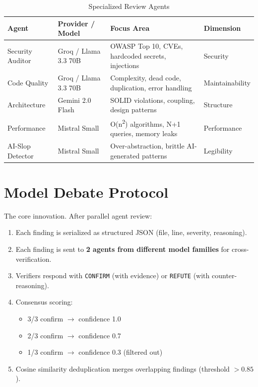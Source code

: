 \documentclass[12pt,a4paper]{article}
\begin{document}
\begin{table}[H]
\centering
\caption{Specialized Review Agents}
\begin{tabularx}{\textwidth}{llXl}
\toprule
\textbf{Agent} & \textbf{Provider / Model} & \textbf{Focus Area} & \textbf{Dimension} \\
\midrule
Security Auditor & Groq / Llama 3.3 70B & OWASP Top 10, CVEs, hardcoded secrets, injections & Security \\
Code Quality & Groq / Llama 3.3 70B & Complexity, dead code, duplication, error handling & Maintainability \\
Architecture & Gemini 2.0 Flash & SOLID violations, coupling, design patterns & Structure \\
Performance & Mistral Small & O(n\textsuperscript{2}) algorithms, N+1 queries, memory leaks & Performance \\
AI-Slop Detector & Mistral Small & Over-abstraction, brittle AI-generated patterns & Legibility \\
\bottomrule
\end{tabularx}
\end{table}

\section{Model Debate Protocol}

The core innovation. After parallel agent review:

\begin{enumerate}
    \item Each finding is serialized as structured JSON (file, line, severity, reasoning).
    \item Each finding is sent to \textbf{2 agents from different model families} for cross-verification.
    \item Verifiers respond with \texttt{CONFIRM} (with evidence) or \texttt{REFUTE} (with counter-reasoning).
    \item Consensus scoring:
    \begin{itemize}
        \item 3/3 confirm $\rightarrow$ confidence 1.0
        \item 2/3 confirm $\rightarrow$ confidence 0.7
        \item 1/3 confirm $\rightarrow$ confidence 0.3 (filtered out)
    \end{itemize}
    \item Cosine similarity deduplication merges overlapping findings (threshold $> 0.85$).
\end{enumerate}
\end{document}
